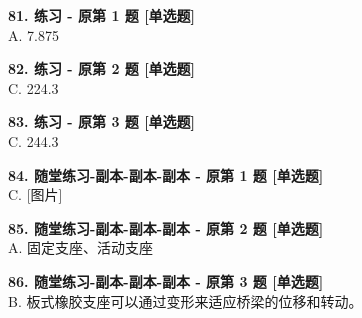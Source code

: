 \documentclass[UTF8,zihao=-4,openany]{ctexbook}
\begin{document}
\begin{answerline}
\textbf{81. 练习 - 原第 1 题 [单选题]}\\
A. 7.875
\end{answerline}

\begin{answerline}
\textbf{82. 练习 - 原第 2 题 [单选题]}\\
C. 224.3
\end{answerline}

\begin{answerline}
\textbf{83. 练习 - 原第 3 题 [单选题]}\\
C. 244.3
\end{answerline}

\begin{answerline}
\textbf{84. 随堂练习-副本-副本-副本 - 原第 1 题 [单选题]}\\
C. [图片]
\end{answerline}

\begin{answerline}
\textbf{85. 随堂练习-副本-副本-副本 - 原第 2 题 [单选题]}\\
A. 固定支座、活动支座
\end{answerline}

\begin{answerline}
\textbf{86. 随堂练习-副本-副本-副本 - 原第 3 题 [单选题]}\\
B. 板式橡胶支座可以通过变形来适应桥梁的位移和转动。
\end{answerline}
\end{document}
